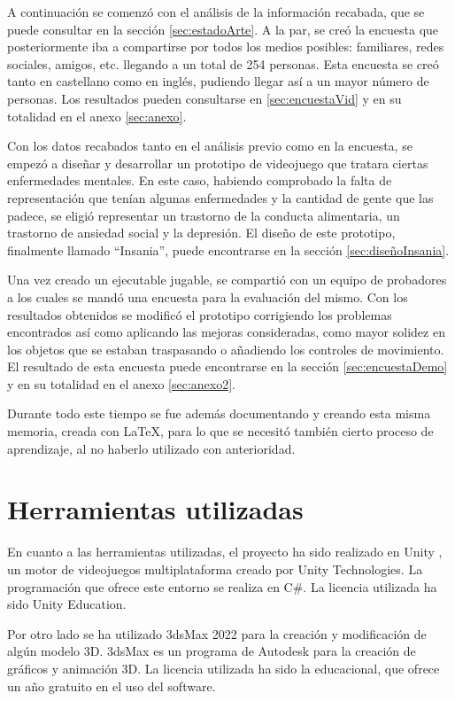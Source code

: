 \documentclass[12pt, a4paper,twoside,titlepage]{book}
\begin{document}
A continuación se comenzó con el análisis de la información recabada, que se puede consultar en la sección \ref{sec:estadoArte}. A la par, se creó la encuesta que posteriormente iba a compartirse por todos los medios posibles: familiares, redes sociales, amigos, etc. llegando a un total de 254 personas. Esta encuesta se creó tanto en castellano como en inglés, pudiendo llegar así a un mayor número de personas. Los resultados pueden consultarse en \ref{sec:encuestaVid} y en su totalidad en el anexo \ref{sec:anexo}. 

Con los datos recabados tanto en el análisis previo como en la encuesta, se empezó a diseñar y desarrollar un prototipo de videojuego que tratara ciertas enfermedades mentales. En este caso, habiendo comprobado la falta de representación que tenían algunas enfermedades y la cantidad de gente que las padece, se eligió representar un trastorno de la conducta alimentaria, un trastorno de ansiedad social y la depresión. El diseño de este prototipo, finalmente llamado ``Insania'', puede encontrarse en la sección \ref{sec:diseñoInsania}. 

Una vez creado un ejecutable jugable, se compartió con un equipo de probadores a los cuales se mandó una encuesta para la evaluación del mismo. Con los resultados obtenidos se modificó el prototipo corrigiendo los problemas encontrados así como aplicando las mejoras consideradas, como mayor solidez en los objetos que se estaban traspasando o añadiendo los controles de movimiento. El resultado de esta encuesta puede encontrarse en la sección \ref{sec:encuestaDemo} y en su totalidad en el anexo \ref{sec:anexo2}. 

Durante todo este tiempo se fue además documentando y creando esta misma memoria, creada con \LaTeX, para lo que se necesitó también cierto proceso de aprendizaje, al no haberlo utilizado con anterioridad. 



\section{Herramientas utilizadas}
En cuanto a las herramientas utilizadas, el proyecto ha sido realizado en Unity \cite{unity}, un motor de videojuegos multiplataforma creado por Unity Technologies. La programación que ofrece este entorno se realiza en C\#. La licencia utilizada ha sido Unity Education. 

Por otro lado se ha utilizado 3dsMax 2022 \cite{3dsmax} para la creación y modificación de algún modelo 3D. 3dsMax es un programa de Autodesk para la creación de gráficos y animación 3D. La licencia utilizada ha sido la educacional, que ofrece un año gratuito en el uso del software. 
\end{document}
